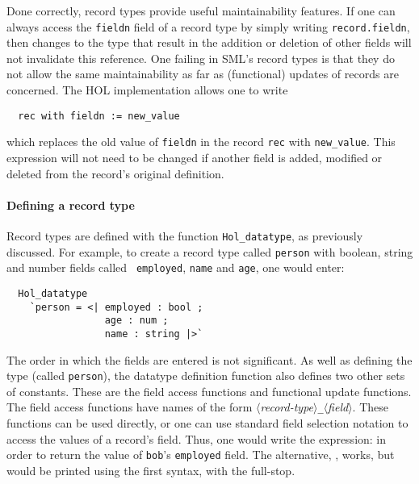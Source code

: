 Done correctly, record types provide useful maintainability features.
If one can always access the {\tt fieldn} field of a record type by
simply writing {\tt record.fieldn}, then changes to the type that
result in the addition or deletion of other fields will not invalidate
this reference.  One failing in SML's record types is that they do not
allow the same maintainability as far as (functional) updates of
records are concerned.  The HOL implementation allows one to write
\begin{hol}
\begin{verbatim}
  rec with fieldn := new_value
\end{verbatim}
\end{hol}
which replaces the old value of {\tt fieldn} in the record {\tt rec}
with {\tt new\_value}.  This expression will not need to be changed if
another field is added, modified or deleted from the record's original
definition.

\paragraph{Defining a record type}
Record types are defined with the function \texttt{Hol\_datatype}, as
previously discussed.  For example, to create a record type called
{\tt person} with boolean, string and number fields called {\tt
  employed}, {\tt name} and {\tt age}, one would enter:
\begin{hol}
\begin{verbatim}
  Hol_datatype
    `person = <| employed : bool ;
                 age : num ;
                 name : string |>`
\end{verbatim}
\end{hol}
The order in which the fields are entered is not significant. As well
as defining the type (called {\tt person}), the datatype definition
function also defines two other sets of constants.  These are the
field access functions and functional update functions.  The field
access functions have names of the form
   $\langle$\textsl{record-type\/}$\rangle$\verb|_|$\langle$\textsl{field\/}$\rangle$.
These functions can be used directly, or one can use standard field
selection notation to access the values of a record's field.  Thus,
one would write the expression:  in order
to return the value of {\tt bob}'s {\tt employed} field.  The
alternative, , works, but would be
printed using the first syntax, with the full-stop.


